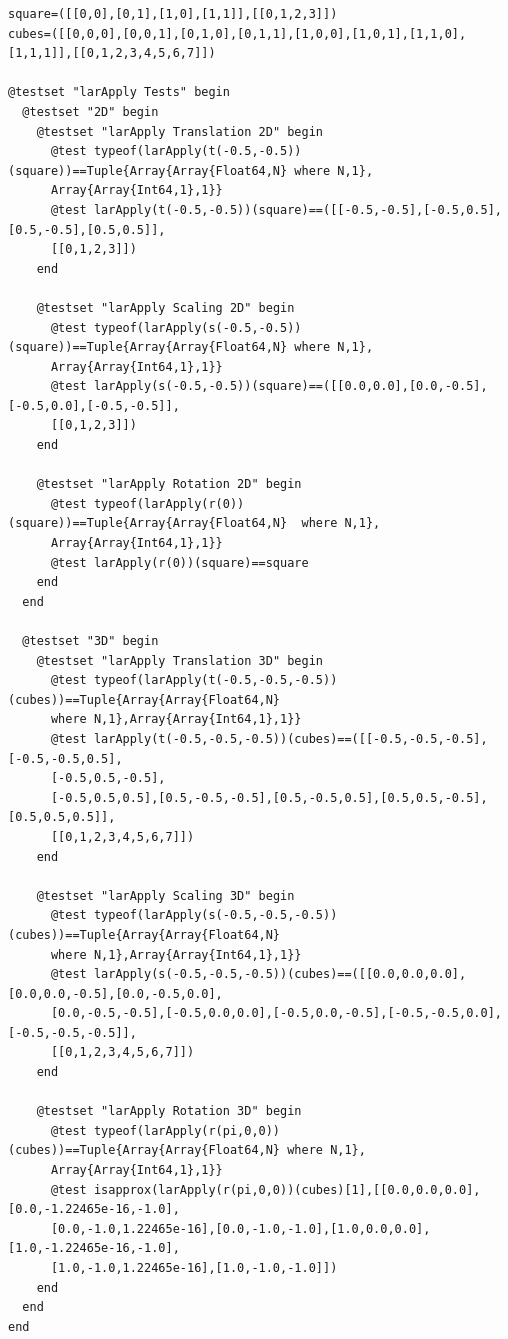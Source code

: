 \documentclass[a4paper,12pt]{article}
\begin{document}
\begin{Verbatim}[fontsize=\footnotesize]
square=([[0,0],[0,1],[1,0],[1,1]],[[0,1,2,3]])
cubes=([[0,0,0],[0,0,1],[0,1,0],[0,1,1],[1,0,0],[1,0,1],[1,1,0],[1,1,1]],[[0,1,2,3,4,5,6,7]])

@testset "larApply Tests" begin
  @testset "2D" begin
    @testset "larApply Translation 2D" begin
      @test typeof(larApply(t(-0.5,-0.5))(square))==Tuple{Array{Array{Float64,N} where N,1},
      Array{Array{Int64,1},1}}
      @test larApply(t(-0.5,-0.5))(square)==([[-0.5,-0.5],[-0.5,0.5],[0.5,-0.5],[0.5,0.5]],
      [[0,1,2,3]])
    end
    
    @testset "larApply Scaling 2D" begin
      @test typeof(larApply(s(-0.5,-0.5))(square))==Tuple{Array{Array{Float64,N} where N,1},
      Array{Array{Int64,1},1}}
      @test larApply(s(-0.5,-0.5))(square)==([[0.0,0.0],[0.0,-0.5],[-0.5,0.0],[-0.5,-0.5]],
      [[0,1,2,3]])
    end
    
    @testset "larApply Rotation 2D" begin
      @test typeof(larApply(r(0))(square))==Tuple{Array{Array{Float64,N}  where N,1},
      Array{Array{Int64,1},1}}
      @test larApply(r(0))(square)==square
    end
  end
  
  @testset "3D" begin
    @testset "larApply Translation 3D" begin
      @test typeof(larApply(t(-0.5,-0.5,-0.5))(cubes))==Tuple{Array{Array{Float64,N}
      where N,1},Array{Array{Int64,1},1}}
      @test larApply(t(-0.5,-0.5,-0.5))(cubes)==([[-0.5,-0.5,-0.5],[-0.5,-0.5,0.5],
      [-0.5,0.5,-0.5],
      [-0.5,0.5,0.5],[0.5,-0.5,-0.5],[0.5,-0.5,0.5],[0.5,0.5,-0.5],[0.5,0.5,0.5]],
      [[0,1,2,3,4,5,6,7]])
    end
    
    @testset "larApply Scaling 3D" begin
      @test typeof(larApply(s(-0.5,-0.5,-0.5))(cubes))==Tuple{Array{Array{Float64,N} 
      where N,1},Array{Array{Int64,1},1}}
      @test larApply(s(-0.5,-0.5,-0.5))(cubes)==([[0.0,0.0,0.0],[0.0,0.0,-0.5],[0.0,-0.5,0.0],
      [0.0,-0.5,-0.5],[-0.5,0.0,0.0],[-0.5,0.0,-0.5],[-0.5,-0.5,0.0],[-0.5,-0.5,-0.5]],
      [[0,1,2,3,4,5,6,7]])
    end
    
    @testset "larApply Rotation 3D" begin
      @test typeof(larApply(r(pi,0,0))(cubes))==Tuple{Array{Array{Float64,N} where N,1},
      Array{Array{Int64,1},1}}
      @test isapprox(larApply(r(pi,0,0))(cubes)[1],[[0.0,0.0,0.0],[0.0,-1.22465e-16,-1.0],
      [0.0,-1.0,1.22465e-16],[0.0,-1.0,-1.0],[1.0,0.0,0.0],[1.0,-1.22465e-16,-1.0],
      [1.0,-1.0,1.22465e-16],[1.0,-1.0,-1.0]])
    end
  end
end
\end{Verbatim}
\end{document}
